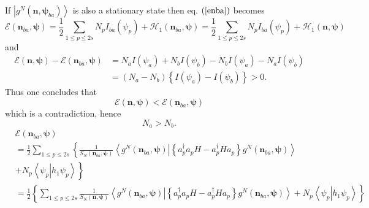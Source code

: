 \documentclass[aps,preprint]{revtex4}%
\begin{document}
If $\left\vert g^{N}\left(  \mathbf{n},\mathbf{\psi}_{ba}\right)
\right\rangle $ is also a stationary state then eq. $\left(  \ref{enba}%
\right)  $ becomes
\begin{equation}
\mathcal{E}\left(  \mathbf{n}_{ba},\mathbf{\psi}\right)  =\frac{1}{2}%
\sum_{1\leq p\leq2s}N_{p}I_{ba}\left(  \psi_{p}\right)  +\mathcal{H}%
_{1}\left(  \mathbf{n}_{ba},\mathbf{\psi}\right)  =\frac{1}{2}\sum_{1\leq
p\leq2s}N_{p}I_{ba}\left(  \psi_{p}\right)  +\mathcal{H}_{1}\left(
\mathbf{n},\mathbf{\psi}\right)
\end{equation}
and
\begin{align}
\mathcal{E}\left(  \mathbf{n},\mathbf{\psi}\right)  -\mathcal{E}\left(
\mathbf{n}_{ba},\mathbf{\psi}\right)   &  =N_{a}I\left(  \psi_{a}\right)
+N_{b}I\left(  \psi_{b}\right)  -N_{b}I\left(  \psi_{a}\right)  -N_{a}I\left(
\psi_{b}\right) \nonumber\\
&  =\left(  N_{a}-N_{b}\right)  \left\{  I\left(  \psi_{a}\right)  -I\left(
\psi_{b}\right)  \right\}  >0.
\end{align}
Thus one concludes that
\begin{equation}
\mathcal{E}\left(  \mathbf{n},\mathbf{\psi}\right)  <\mathcal{E}\left(
\mathbf{n}_{ba},\mathbf{\psi}\right)
\end{equation}
which is a contradiction, hence
\begin{equation}
N_{a}>N_{b}.
\end{equation}%
\begin{align}
&  \mathcal{E}\left(  \mathbf{n}_{ba},\mathbf{\psi}\right) \nonumber\\
&  =\frac{1}{2}%
{\textstyle\sum\limits_{1\leq p\leq2s}}
\left\{  \frac{1}{S_{N}\left(  \mathbf{n}_{ba},\mathbf{\psi}\right)
}\left\langle \left.  g^{N}\left(  \mathbf{n}_{ba},\mathbf{\psi}\right)
\right\vert \left\{  a_{p}^{\dagger}a_{p}H-a_{p}^{\dagger}Ha_{p}\right\}
g^{N}\left(  \mathbf{n}_{ba},\mathbf{\psi}\right)  \right\rangle \right. \\
&  +\left.  N_{p}\left\langle \left.  \psi_{p}\right\vert h_{1}\psi
_{p}\right\rangle \right\} \\
&  =\frac{1}{2}\left\{
{\textstyle\sum\limits_{1\leq p\leq2s}}
\frac{1}{S_{N}\left(  \mathbf{n},\mathbf{\psi}\right)  }\left\langle \left.
g^{N}\left(  \mathbf{n}_{ba},\mathbf{\psi}\right)  \right\vert \left\{
a_{p}^{\dagger}a_{p}H-a_{p}^{\dagger}Ha_{p}\right\}  g^{N}\left(
\mathbf{n}_{ba},\mathbf{\psi}\right)  \right\rangle +N_{p}\left\langle \left.
\psi_{p}\right\vert h_{1}\psi_{p}\right\rangle \right\}
\end{align}%
\end{document}
